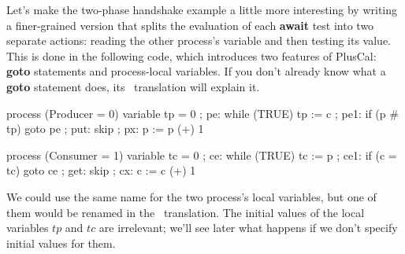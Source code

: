 \documentclass[fleqn,leqno]{article}
\begin{document}
Let's make the two-phase handshake example a little more interesting
by writing a finer-grained version that splits the evaluation of
each \textbf{await} test into two separate actions: reading the
other process's variable and then testing its value.  This is done
in the following code, which introduces two features of PlusCal:
\textbf{goto} statements and 
process-local variables.  If you don't already know what a
\textbf{goto} statement does, its \tlaplus\ translation will explain
it.
\begin{display}
\begin{twocols}[.45]
\begin{nopcal}
process (Producer = 0) 
  variable tp = 0 ;
  { pe: while (TRUE)
          {      tp := c ;
            pe1: if (p # tp) {goto pe} ; 
            put: skip ;
            px:  p := p (+) 1   }
  }
\end{nopcal}
\begin{tlatex}
%
%
%
%
%
\end{tlatex}
\midcol
\begin{nopcal}
process (Consumer = 1)
  variable tc = 0 ;
  { ce: while (TRUE)
          {      tc := p ; 
            ce1: if (c = tc) {goto ce} ;
            get: skip ;
            cx:  c := c (+) 1   }
  }
\end{nopcal}
\begin{tlatex}
%
%
%
%
%
\end{tlatex}
\end{twocols}
\end{display}
We could use the same name for the two process's local variables, but
one of them would be renamed in the \tlaplus\ translation.  The
initial values of the local variables $tp$ and $tc$ are irrelevant;
we'll see later what happens if we don't specify initial values for them.
\end{document}
